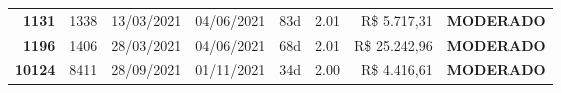 \documentclass[a4paper,10pt]{article}
\begin{document}
\begin{center}
\begin{longtable}{>{\scriptsize}r>{\scriptsize}r>{\scriptsize}c>{\scriptsize}c>{\scriptsize}r>{\scriptsize}r>{\scriptsize}r>{\scriptsize}l}
\textcolor{anomyellow}{\textbf{1131}} & 1338 & 13/03/2021 & 04/06/2021 & 83d & \textcolor{anomyellow}{2.01} & R\$ 5.717,31 & \textcolor{anomyellow}{\textbf{MODERADO}} \\

\textcolor{anomyellow}{\textbf{1196}} & 1406 & 28/03/2021 & 04/06/2021 & 68d & \textcolor{anomyellow}{2.01} & R\$ 25.242,96 & \textcolor{anomyellow}{\textbf{MODERADO}} \\

\textcolor{anomyellow}{\textbf{10124}} & 8411 & 28/09/2021 & 01/11/2021 & 34d & \textcolor{anomyellow}{2.00} & R\$ 4.416,61 & \textcolor{anomyellow}{\textbf{MODERADO}} \\

\end{longtable}\end{center}
\end{document}
